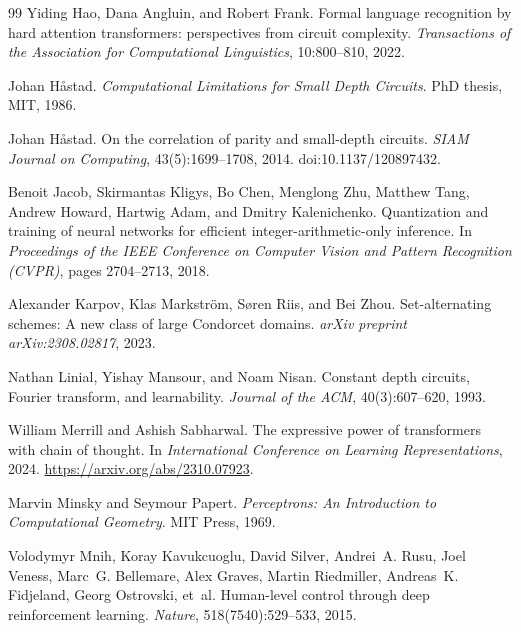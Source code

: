 \documentclass[twoside,11pt]{article}
\numberwithin{theorem}{section}
\numberwithin{equation}{section}
\begin{document}
\begin{thebibliography}{99}
Yiding Hao, Dana Angluin, and Robert Frank.
\newblock Formal language recognition by hard attention transformers:
perspectives from circuit complexity.
\newblock \emph{Transactions of the Association for Computational Linguistics},
10:800--810, 2022.

Johan H{\aa}stad.
\newblock \emph{Computational Limitations for Small Depth Circuits}.
\newblock PhD thesis, MIT, 1986.

Johan H{\aa}stad.
\newblock On the correlation of parity and small-depth circuits.
\newblock \emph{SIAM Journal on Computing}, 43(5):1699--1708, 2014.
\newblock doi:10.1137/120897432.

Benoit Jacob, Skirmantas Kligys, Bo Chen, Menglong Zhu, Matthew Tang, Andrew Howard, Hartwig Adam, and Dmitry Kalenichenko.
\newblock Quantization and training of neural networks for efficient integer-arithmetic-only inference.
\newblock In \emph{Proceedings of the IEEE Conference on Computer Vision and Pattern Recognition (CVPR)}, pages 2704--2713, 2018.

Alexander Karpov, Klas Markstr{\"o}m, S{\o}ren Riis, and Bei Zhou.
\newblock Set-alternating schemes: A new class of large Condorcet domains.
\newblock \emph{arXiv preprint arXiv:2308.02817}, 2023.

Nathan Linial, Yishay Mansour, and Noam Nisan.
\newblock Constant depth circuits, Fourier transform, and learnability.
\newblock \emph{Journal of the ACM}, 40(3):607--620, 1993.

William Merrill and Ashish Sabharwal.
\newblock The expressive power of transformers with chain of thought.
\newblock In \emph{International Conference on Learning Representations}, 2024.
\newblock \url{https://arxiv.org/abs/2310.07923}.

Marvin Minsky and Seymour Papert.
\newblock \emph{Perceptrons: An Introduction to Computational Geometry}.
\newblock MIT Press, 1969.

Volodymyr Mnih, Koray Kavukcuoglu, David Silver, Andrei~A. Rusu, Joel Veness,
Marc~G. Bellemare, Alex Graves, Martin Riedmiller, Andreas~K. Fidjeland,
Georg Ostrovski, et~al.
\newblock Human-level control through deep reinforcement learning.
\newblock \emph{Nature}, 518(7540):529--533, 2015.


\end{thebibliography}
\end{document}
